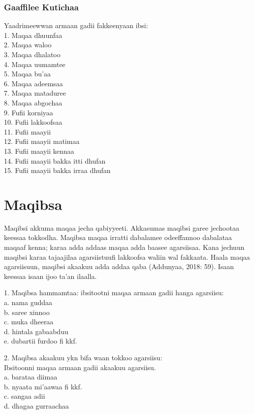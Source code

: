 \documentclass[11pt,b5paper]{book}
\begin{document}
\subsubsection{Gaaffilee Kutichaa}

Yaadrimeewwan armaan gadii fakkeenyaan ibsi:\\
1. Maqaa dhuunfaa\\
2. Maqaa waloo\\
3. Maqaa dhalatoo\\
4. Maqaa uumamtee\\
5. Maqaa bu’aa\\
6. Maqaa adeemsaa\\
7. Maqaa mataduree\\
8. Maqaa abgochaa\\
9. Fufii korniyaa\\
10. Fufii lakkoofsaa\\
11. Fufii maayii\\
12. Fufii maayii matimaa\\
13. Fufii maayii kennaa\\
14. Fufii maayii bakka itti dhufan\\
15. Fufii maayii bakka irraa dhufan

\newpage
\section{Maqibsa}
Maqibsi akkuma maqaa jecha qabiyyeeti. Akkasumas maqibsi garee jechootaa keessaa tokkodha. Maqibsa maqaa irratti
dabalamee odeeffannoo dabalataa maqaaf kenna; karaa adda addaas maqaa adda baasee agarsiisaa. Kana jechuun maqibsi
karaa tajaajilaa agarsiistuufi lakkoofsa waliin wal fakkaata. Haala maqaa agarsiisuun, maqibsi akaakuu adda addaa qaba (Addunyaa, 2018: 59). Isaan keessaa isaan ijoo ta’an ilaalla. 

1. Maqibsa hammamtaa: ibsitootni maqaa armaan gadii hanga
agarsiisu: \\
a. nama guddaa \\
b. saree xinnoo \\
c. muka dheeraa \\
d. hintala gabaabduu \\
e. dubartii furdoo fi kkf. \

2. Maqibsa akaakuu ykn bifa waan tokkoo agarsiisu:\\
Ibsitoonni maqaa armaan gadii akaakuu agarsiisu.\\
a. barataa diimaa\\
b. nyaata mi'aawaa fi kkf. \\
c. sangaa adii\\
d. dhagaa gurraachaa 
\end{document}
